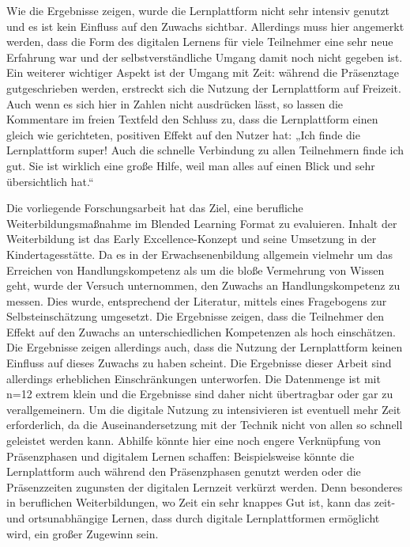 \documentclass[12pt,smallheadings, bibliography=totoc]{scrartcl}
\begin{document}
Wie die Ergebnisse zeigen, wurde die Lernplattform nicht sehr intensiv
genutzt und es ist kein Einfluss auf den Zuwachs sichtbar. Allerdings
muss hier angemerkt werden, dass die Form des digitalen Lernens für
viele Teilnehmer eine sehr neue Erfahrung war und der
selbstverständliche Umgang damit noch nicht gegeben ist. Ein weiterer
wichtiger Aspekt ist der Umgang mit Zeit: während die Präsenztage
gutgeschrieben werden, erstreckt sich die Nutzung der Lernplattform auf
Freizeit. Auch wenn es sich hier in Zahlen nicht ausdrücken lässt, so
lassen die Kommentare im freien Textfeld den Schluss zu, dass die
Lernplattform einen gleich wie gerichteten, positiven Effekt auf den
Nutzer hat: „Ich finde die Lernplattform super! Auch die schnelle
Verbindung zu allen Teilnehmern finde ich gut. Sie ist wirklich eine
große Hilfe, weil man alles auf einen Blick und sehr übersichtlich
hat.``

Die vorliegende Forschungsarbeit hat das Ziel, eine berufliche
Weiterbildungsmaßnahme im Blended Learning Format zu evaluieren. Inhalt
der Weiterbildung ist das Early Excellence-Konzept und seine Umsetzung
in der Kindertagesstätte. Da es in der Erwachsenenbildung allgemein
vielmehr um das Erreichen von Handlungskompetenz als um die bloße
Vermehrung von Wissen geht, wurde der Versuch unternommen, den Zuwachs
an Handlungskompetenz zu messen. Dies wurde, entsprechend der Literatur,
mittels eines Fragebogens zur Selbsteinschätzung umgesetzt. Die
Ergebnisse zeigen, dass die Teilnehmer den Effekt auf den Zuwachs an
unterschiedlichen Kompetenzen als hoch einschätzen. Die Ergebnisse
zeigen allerdings auch, dass die Nutzung der Lernplattform keinen
Einfluss auf dieses Zuwachs zu haben scheint. Die Ergebnisse dieser
Arbeit sind allerdings erheblichen Einschränkungen unterworfen. Die
Datenmenge ist mit n=12 extrem klein und die Ergebnisse sind daher nicht
übertragbar oder gar zu verallgemeinern. Um die digitale Nutzung zu
intensivieren ist eventuell mehr Zeit erforderlich, da die
Auseinandersetzung mit der Technik nicht von allen so schnell geleistet
werden kann. Abhilfe könnte hier eine noch engere Verknüpfung von
Präsenzphasen und digitalem Lernen schaffen: Beispielsweise könnte die
Lernplattform auch während den Präsenzphasen genutzt werden oder die
Präsenzzeiten zugunsten der digitalen Lernzeit verkürzt werden. Denn
besonderes in beruflichen Weiterbildungen, wo Zeit ein sehr knappes Gut
ist, kann das zeit- und ortsunabhängige Lernen, dass durch digitale
Lernplattformen ermöglicht wird, ein großer Zugewinn sein.

\pagebreak
\printbibliography
\end{document}
